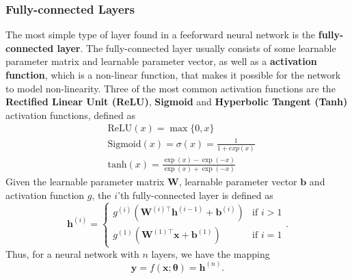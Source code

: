\documentclass[./main.tex]{subfiles}
\begin{document}
\subsubsection{Fully-connected Layers}
The most simple type of layer found in a feeforward neural network is the \textbf{fully-connected layer}. The fully-connected layer usually consists of some learnable parameter matrix and learnable parameter vector, as well as a \textbf{activation function}, which is a non-linear function, that makes it possible for the network to model non-linearity. Three of the most common activation functions are the \textbf{Rectified Linear Unit (ReLU)}, \textbf{Sigmoid} and \textbf{Hyperbolic Tangent (Tanh)} activation functions, defined as
\begin{align}
    &\text{ReLU}(x) = \max\{0, x\} \\ 
    &\text{Sigmoid}(x) = \sigma(x) = \frac{1}{1 + exp(x)} \\ 
    &\text{tanh}(x) = \frac{\exp(x) - \exp(-x)}{\exp(x) + \exp(-x)}
\end{align}
Given the learnable parameter matrix $\bm{W}$, learnable parameter vector $\bm{b}$ and activation function $g$, the $i$'th fully-connected layer is defined as
\begin{equation}
    \bm{h}^{(i)} =
    \begin{cases}
        g^{(i)} \left( \bm{W}^{(i) \top} \bm{h}^{(i - 1)} + \bm{b}^{(i)} \right) & \text{if } i > 1 \\
        g^{(1)} \left( \bm{W}^{(1) \top} \bm{x} + \bm{b}^{(1)} \right) & \text{if } i = 1
    \end{cases}
    .
\end{equation}
Thus, for a neural network with $n$ layers, we have the mapping \cite{DL_book}
\begin{equation}
    \bm{y} = f(\bm{x};\bm{\theta}) = \bm{h}^{(n)}.
\end{equation}
\end{document}
